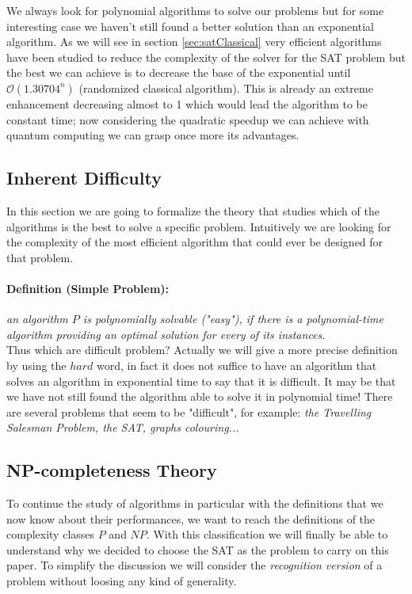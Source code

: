 \documentclass[english]{article}
\begin{document}
			We always look for polynomial algorithms to solve our problems but for some interesting case we haven't still found a better solution than an exponential algorithm. As we will see in section \ref{sec:satClassical} very efficient algorithms have been studied to reduce the complexity of the solver for the SAT problem but the best we can achieve is to decrease the base of the exponential until $\mathcal{O}(1.30704^n)$ (randomized classical algorithm). This is already an extreme enhancement decreasing almost to 1 which would lead the algorithm to be constant time; now considering the quadratic speedup we can achieve with quantum computing we can grasp once more its advantages. 
		
		\subsection{Inherent Difficulty}
		\label{sec:inherentDifficulty}
			In this section we are going to formalize the theory that studies which of the algorithms is the best to solve a specific problem. Intuitively we are looking for the complexity of the most efficient algorithm that could ever be designed for that problem.
			
			\paragraph{Definition (Simple Problem):} \emph{an algorithm $P$ is polynomially solvable ("easy"), if there is a polynomial-time algorithm providing an optimal solution for every of its instances.} \\
			
			Thus which are difficult problem? Actually we will give a more precise definition by using the $hard$ word, in fact it does not suffice to have an algorithm that solves an algorithm in exponential time to say that it is difficult. It may be that we have not still found the algorithm able to solve it in polynomial time! There are several problems that seem to be "difficult", for example: \emph{the Travelling Salesman Problem, the SAT, graphs colouring...}
		
		\subsection{NP-completeness Theory}
		\label{sec:npCompleteness}
			To continue the study of algorithms in particular with the definitions that we now know about their performances, we want to reach the definitions of the complexity classes $P$ and $NP$. With this classification we will finally be able to understand why we decided to choose the SAT as the problem to carry on this paper. To simplify the discussion we will consider the \emph{recognition version} of a problem without loosing any kind of generality.
			
\end{document}

